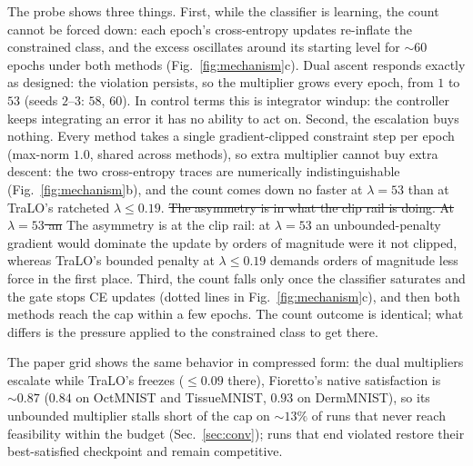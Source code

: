 \documentclass[10pt]{article}
\newcommand{\del}[1]{{\color{red}\sout{#1}}}
\begin{document}
The probe shows three things. First, while the classifier is learning,
the count cannot be forced down: each epoch's cross-entropy updates
re-inflate the constrained class, and the excess oscillates around its
starting level for ${\sim}60$ epochs under both methods
(Fig.~\ref{fig:mechanism}c). Dual ascent responds exactly as designed:
the violation persists, so the multiplier grows every epoch, from $1$ to
$53$ (seeds $2$--$3$: $58$, $60$). In control terms this is integrator
windup: the controller keeps integrating an error it has no ability to
act on. Second, the escalation buys nothing. Every method takes a
single gradient-clipped constraint step per epoch (max-norm $1.0$,
shared across methods), so extra multiplier cannot buy extra descent:
the two cross-entropy traces are numerically indistinguishable
(Fig.~\ref{fig:mechanism}b), and the count comes down no faster at
$\lambda{=}53$ than at TraLO's ratcheted $\lambda\le 0.19$. \del{The
asymmetry is in what the clip rail is doing. At $\lambda{=}53$ an}%
{\color{blue}The asymmetry is at the clip rail: at $\lambda{=}53$ an}
unbounded-penalty gradient would dominate the update by orders of
magnitude were it not clipped, whereas TraLO's bounded penalty at
$\lambda\le 0.19$ demands orders of magnitude less force in the first
place. Third, the count falls only once the classifier saturates and the
gate stops CE updates (dotted lines in Fig.~\ref{fig:mechanism}c), and
then both methods reach the cap within a few epochs. The count outcome is
identical; what differs is the pressure applied to the constrained class
to get there.

The paper grid shows the same behavior in compressed form: the dual
multipliers escalate while TraLO's freezes ($\le 0.09$ there),
Fioretto's native satisfaction is ${\sim}0.87$ ($0.84$ on OctMNIST and
TissueMNIST, $0.93$ on DermMNIST), so its unbounded multiplier stalls
short of the cap on ${\sim}13\%$ of runs that never reach feasibility
within the budget (Sec.~\ref{sec:conv}); runs that end violated restore
their best-satisfied checkpoint and remain competitive.
\end{document}
